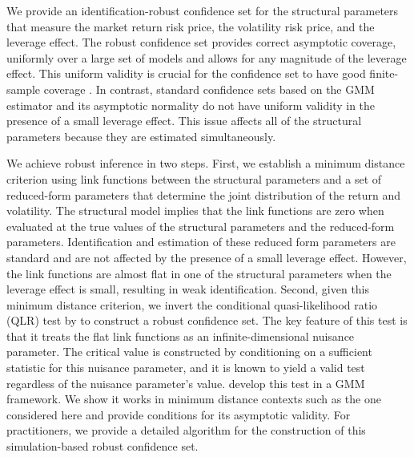 We provide an identification-robust confidence set for the structural parameters that measure the market return risk price, the volatility risk price, and the leverage effect. 
The robust confidence set provides correct asymptotic coverage, uniformly over a large set of models and allows for any magnitude of the leverage effect. This uniform validity is crucial for the confidence set to have good finite-sample coverage \parencites{mikusheva2007uniform, andrews2010asymptotic}. In contrast, standard confidence sets based on the GMM estimator and its asymptotic normality do not have uniform validity in the presence of a small leverage effect. This issue affects all of the structural parameters because they are estimated simultaneously.

We achieve robust inference in two steps. First, we establish a minimum distance criterion using link functions between the structural parameters and a set of reduced-form parameters that determine the joint distribution of the return and volatility. The structural model implies that the link functions are zero when evaluated at the true values of the structural parameters and the reduced-form parameters. Identification and estimation of these reduced form parameters are standard and are not affected by the presence of a small leverage effect. However, the link functions are almost flat in one of the structural parameters when the leverage effect is small, resulting in weak identification. Second, given this minimum distance criterion, we invert the conditional quasi-likelihood ratio (QLR) test by \textcite{andrews2016conditional} to construct a robust confidence set. The key feature of this test is that it treats the flat link functions as an infinite-dimensional nuisance parameter. The critical value is constructed by conditioning on a sufficient statistic for this nuisance parameter, and it is known to yield a valid test regardless of the nuisance parameter's value. \Textcite{andrews2016conditional} develop this test in a GMM framework. We show it works in minimum distance contexts such as the one considered here and provide conditions for its asymptotic validity. For practitioners, we provide a detailed algorithm for the construction of this simulation-based robust confidence set.


